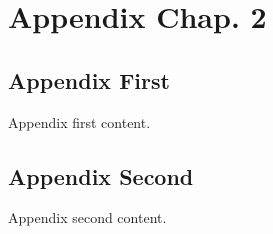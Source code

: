 \newpage
{}

\chapter{Appendix Chap. 2}
\label{appendix:chap2}

\section{Appendix First}
Appendix first content.

\section{Appendix Second}
Appendix second content.

